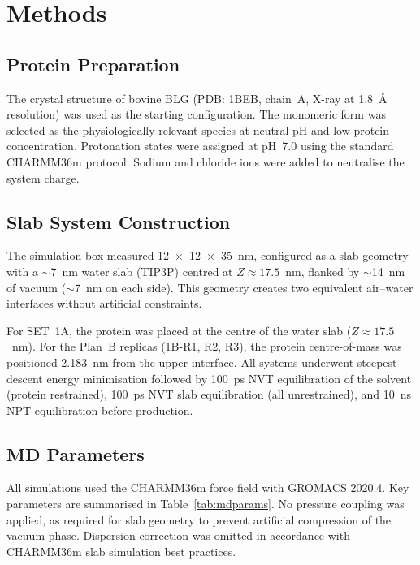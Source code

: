 \documentclass[journal=langd5,manuscript=article]{achemso}
\begin{document}
\section{Methods}

\subsection{Protein Preparation}

The crystal structure of bovine BLG (PDB: 1BEB, chain~A, X-ray at 1.8~\r{A}
resolution)\cite{Brownlow1997} was used as the starting configuration. The
monomeric form was selected as the physiologically relevant species at neutral
pH and low protein concentration. Protonation states were assigned at pH~7.0
using the standard CHARMM36m protocol. Sodium and chloride ions were added to
neutralise the system charge.

\subsection{Slab System Construction}

The simulation box measured 12~$\times$~12~$\times$~35~nm, configured as a
slab geometry with a $\sim$7~nm water slab (TIP3P\cite{Jorgensen1983}) centred
at $Z \approx 17.5$~nm, flanked by $\sim$14~nm of vacuum ($\sim$7~nm on each
side). This geometry creates two equivalent air--water interfaces without
artificial constraints.

For SET~1A, the protein was placed at the centre of the water slab
($Z \approx 17.5$~nm). For the Plan~B replicas (1B-R1, R2, R3), the protein
centre-of-mass was positioned 2.183~nm from the upper interface. All systems
underwent steepest-descent energy minimisation followed by 100~ps NVT
equilibration of the solvent (protein restrained), 100~ps NVT slab equilibration
(all unrestrained), and 10~ns NPT equilibration before production.

\subsection{MD Parameters}

All simulations used the CHARMM36m force field\cite{Huang2017} with GROMACS
2020.4.\cite{Abraham2015} Key parameters are summarised in Table~\ref{tab:mdparams}.
No pressure coupling was applied, as required for slab geometry to prevent
artificial compression of the vacuum phase. Dispersion correction was omitted
in accordance with CHARMM36m slab simulation best practices.
\end{document}
